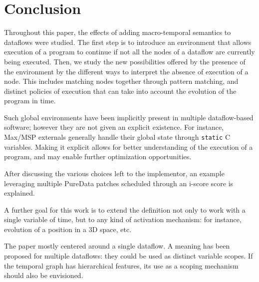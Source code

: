 \documentclass{article}
\begin{document}
\section{Conclusion}
Throughout this paper, the effects of adding macro-temporal semantics to dataflows were studied. 
The first step is to introduce an environment that allows execution of a program to continue if not all the nodes of a dataflow are currently being executed.
Then, we study the new possibilities offered by the presence of the environment by the different ways to interpret the absence of execution of a node.
This includes matching nodes together through pattern matching, and distinct policies of execution that can take into account the evolution of the program in time.

Such global environments have been implicitly present in multiple dataflow-based software; however they are not given an explicit existence. For instance, Max/MSP externals generally handle their global state through \lstinline|static| C variables. Making it explicit allows for better understanding of the execution of a program, and may enable further optimization opportunities.

After discussing the various choices left to the implementor, an example leveraging multiple PureData patches scheduled through an i-score score is explained.

A further goal for this work is to extend the definition not only to work with a single variable of time, but to any kind of activation mechanism: for instance, evolution of a position in a 3D space, etc.

The paper mostly centered around a single dataflow. A meaning has been proposed for multiple dataflows: they could be used as distinct variable scopes. If the temporal graph has hierarchical features, its use as a scoping mechanism should also be envisioned.

\printbibliography

    
\end{document}
